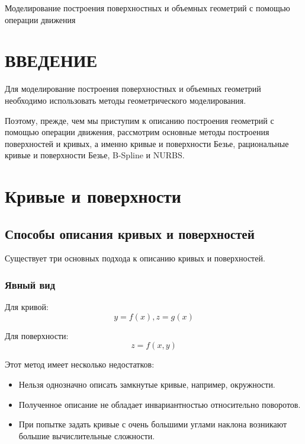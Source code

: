 \documentclass{bmstu}
\begin{document}
\makecourseworktitle
{} %
{} %
{Моделирование построения поверхностных и объемных геометрий с помощью операции движения} %
{} %
{} %
{} %

\maketableofcontents

\chapter*{ВВЕДЕНИЕ}
Для моделирование построения поверхностных и объемных геометрий необходимо использовать методы геометрического моделирования.

Поэтому, прежде, чем мы приступим к описанию построения геометрий с помощью операции движения, рассмотрим основные методы построения поверхностей и кривых, а именно  кривые и поверхности Безье, рациональные кривые и поверхности Безье, B-Spline и NURBS.


\chapter{Кривые и поверхности}
\section{Способы описания кривых и поверхностей}
Существует три основных подхода к описанию кривых и поверхностей.
\subsection{Явный вид}

Для кривой:
\begin{equation*}
    y=f(x), z = g(x)
\end{equation*}

Для поверхности:
\begin{equation*}
    z = f(x, y)
\end{equation*}

Этот метод имеет несколько недостатков:
\begin{itemize}
    \item Нельзя однозначно описать замкнутые кривые, например, окружности.
    \item Полученное описание не обладает инвариантностью относительно поворотов.
    \item При попытке задать кривые с очень большими углами наклона возникают большие вычислительные сложности.
\end{itemize}
\end{document}
